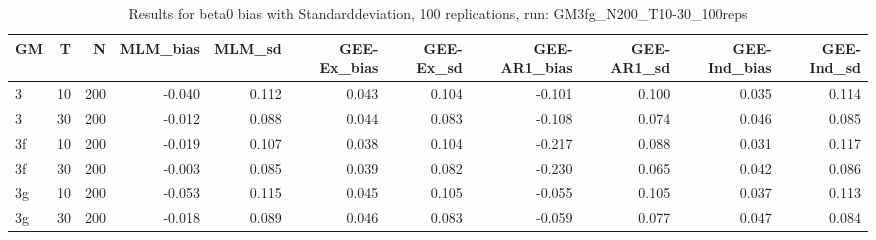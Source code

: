 \begin{table}[ht]
\centering
\begin{tabular}{lrrrrrrrrrr}
  \hline
GM & T & N & MLM\_bias & MLM\_sd & GEE-Ex\_bias & GEE-Ex\_sd & GEE-AR1\_bias & GEE-AR1\_sd & GEE-Ind\_bias & GEE-Ind\_sd \\ 
  \hline
3 & 10 & 200 & -0.040 & 0.112 & 0.043 & 0.104 & -0.101 & 0.100 & 0.035 & 0.114 \\ 
  3 & 30 & 200 & -0.012 & 0.088 & 0.044 & 0.083 & -0.108 & 0.074 & 0.046 & 0.085 \\ 
  3f & 10 & 200 & -0.019 & 0.107 & 0.038 & 0.104 & -0.217 & 0.088 & 0.031 & 0.117 \\ 
  3f & 30 & 200 & -0.003 & 0.085 & 0.039 & 0.082 & -0.230 & 0.065 & 0.042 & 0.086 \\ 
  3g & 10 & 200 & -0.053 & 0.115 & 0.045 & 0.105 & -0.055 & 0.105 & 0.037 & 0.113 \\ 
  3g & 30 & 200 & -0.018 & 0.089 & 0.046 & 0.083 & -0.059 & 0.077 & 0.047 & 0.084 \\ 
   \hline
\end{tabular}
\caption{Results for beta0 bias with Standarddeviation, 100 replications, run: GM3fg_N200_T10-30_100reps} 
\label{tab:beta0_bias_sd}
\end{table}
